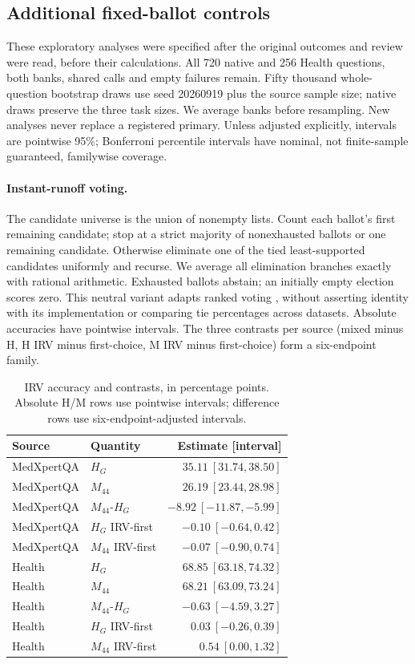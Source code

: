 \subsection{Additional fixed-ballot controls}\label{app:irv}

These exploratory analyses were specified after the original outcomes and review were read, before their calculations. All 720 native and 256 Health questions, both banks, shared calls and empty failures remain. Fifty thousand whole-question bootstrap draws use seed 20260919 plus the source sample size; native draws preserve the three task sizes. We average banks before resampling. New analyses never replace a registered primary. Unless adjusted explicitly, intervals are pointwise 95\%; Bonferroni percentile intervals have nominal, not finite-sample guaranteed, familywise coverage.

\paragraph{Instant-runoff voting.}
The candidate universe is the union of nonempty lists. Count each ballot's first remaining candidate; stop at a strict majority of nonexhausted ballots or one remaining candidate. Otherwise eliminate one of the tied least-supported candidates uniformly and recurse. We average all elimination branches exactly with rational arithmetic. Exhausted ballots abstain; an initially empty election scores zero. This neutral variant adapts ranked voting \citep{wang2025ranked}, without asserting identity with its implementation or comparing tie percentages across datasets. Absolute accuracies have pointwise intervals. The three contrasts per source (mixed minus H, H IRV minus first-choice, M IRV minus first-choice) form a six-endpoint family.
\begin{table}[htbp]\centering\small
\caption{IRV accuracy and contrasts, in percentage points. Absolute H/M rows use pointwise intervals; difference rows use six-endpoint-adjusted intervals.}
\label{tab:irv}
\begin{tabular}{llr}
\toprule
Source & Quantity & Estimate [interval]\\
\midrule
MedXpertQA & $H_G$ & $35.11\ [31.74,38.50]$\\
MedXpertQA & $M_{44}$ & $26.19\ [23.44,28.98]$\\
MedXpertQA & $M_{44}$-$H_G$ & $-8.92\ [-11.87,-5.99]$\\
MedXpertQA & $H_G$ IRV-first & $-0.10\ [-0.64,0.42]$\\
MedXpertQA & $M_{44}$ IRV-first & $-0.07\ [-0.90,0.74]$\\
Health & $H_G$ & $68.85\ [63.18,74.32]$\\
Health & $M_{44}$ & $68.21\ [63.09,73.24]$\\
Health & $M_{44}$-$H_G$ & $-0.63\ [-4.59,3.27]$\\
Health & $H_G$ IRV-first & $0.03\ [-0.26,0.39]$\\
Health & $M_{44}$ IRV-first & $0.54\ [0.00,1.32]$\\
\bottomrule
\end{tabular}
\end{table}


